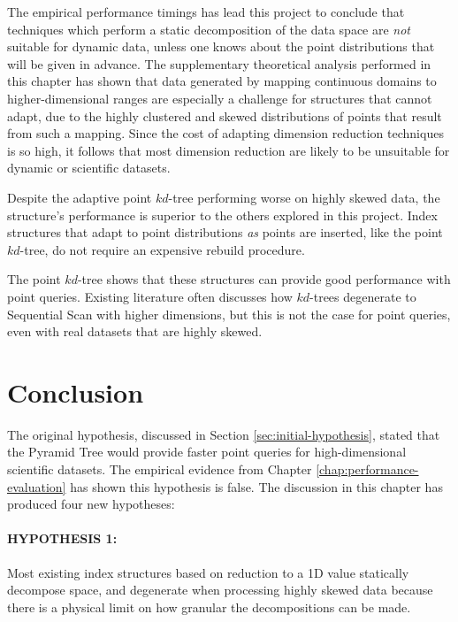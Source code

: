 The empirical performance timings has lead this project to conclude that techniques which perform a static decomposition of the data space are \textit{not} suitable for dynamic data, unless one knows about the point distributions that will be given in advance. The supplementary theoretical analysis performed in this chapter has shown that data generated by mapping continuous domains to higher-dimensional ranges are especially a challenge for structures that cannot adapt, due to the highly clustered and skewed distributions of points that result from such a mapping. Since the cost of adapting dimension reduction techniques is so high, it follows that most dimension reduction are likely to be unsuitable for dynamic or scientific datasets.

Despite the adaptive point $kd$-tree performing worse on highly skewed data, the structure's performance is superior to the others explored in this project. Index structures that adapt to point distributions \textit{as} points are inserted, like the point $kd$-tree, do not require an expensive rebuild procedure.

The point $kd$-tree shows that these structures can provide good performance with point queries. Existing literature often discusses how $kd$-trees degenerate to Sequential Scan with higher dimensions, but this is not the case for point queries, even with real datasets that are highly skewed.

\section{Conclusion}

The original hypothesis, discussed in Section \ref{sec:initial-hypothesis}, stated that the Pyramid Tree would provide faster point queries for high-dimensional scientific datasets. The empirical evidence from Chapter \ref{chap:performance-evaluation} has shown this hypothesis is false. The discussion in this chapter has produced four new hypotheses:

\vspace{-5pt}

\paragraph{\textbf{HYPOTHESIS 1:}} Most existing index structures based on reduction to a 1D value statically decompose space, and degenerate when processing highly skewed data because there is a physical limit on how granular the decompositions can be made.


